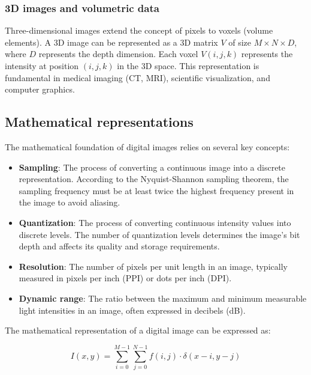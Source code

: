 \subsubsection{3D images and volumetric data}
Three-dimensional images extend the concept of pixels to voxels
(volume elements). A 3D image can be represented as a 3D matrix $V$
of size $M \times N \times D$, where $D$ represents the depth
dimension. Each voxel $V(i,j,k)$ represents the intensity at position
$(i,j,k)$ in the 3D space. This representation is fundamental in
medical imaging (CT, MRI), scientific visualization, and computer graphics.

\subsection{Mathematical representations}

The mathematical foundation of digital images relies on several key concepts:

\begin{itemize}
  \item \textbf{Sampling}: The process of converting a continuous
    image into a discrete representation. According to the
    Nyquist-Shannon sampling theorem, the sampling frequency must be
    at least twice the highest frequency present in the image to avoid aliasing.

  \item \textbf{Quantization}: The process of converting continuous
    intensity values into discrete levels. The number of quantization
    levels determines the image's bit depth and affects its quality
    and storage requirements.

  \item \textbf{Resolution}: The number of pixels per unit length in
    an image, typically measured in pixels per inch (PPI) or dots per
    inch (DPI).

  \item \textbf{Dynamic range}: The ratio between the maximum and
    minimum measurable light intensities in an image, often expressed
    in decibels (dB).
\end{itemize}

The mathematical representation of a digital image can be expressed as:

\begin{equation}
  I(x,y) = \sum_{i=0}^{M-1} \sum_{j=0}^{N-1} f(i,j) \cdot \delta(x-i, y-j)
\end{equation}

